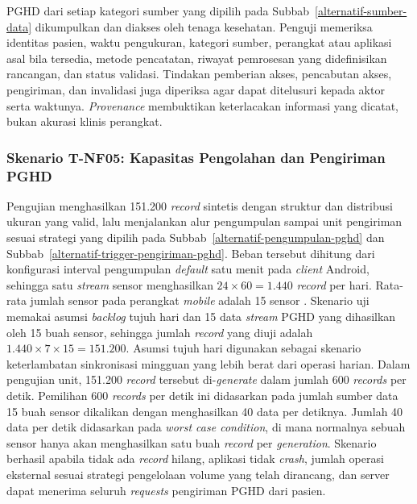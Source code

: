 PGHD dari setiap kategori sumber yang dipilih pada Subbab~\ref{alternatif-sumber-data} dikumpulkan dan diakses oleh tenaga kesehatan.
Penguji memeriksa identitas pasien, waktu pengukuran, kategori sumber, perangkat atau aplikasi asal bila tersedia, metode pencatatan, riwayat pemrosesan yang didefinisikan rancangan, dan status validasi.
Tindakan pemberian akses, pencabutan akses, pengiriman, dan invalidasi juga diperiksa agar dapat ditelusuri kepada aktor serta waktunya.
\textit{Provenance} membuktikan keterlacakan informasi yang dicatat, bukan akurasi klinis perangkat.


\subsubsection{Skenario T-NF05: Kapasitas Pengolahan dan Pengiriman PGHD}

Pengujian menghasilkan 151.200 \textit{record} sintetis dengan struktur dan distribusi ukuran yang valid, lalu menjalankan alur pengumpulan sampai unit pengiriman sesuai strategi yang dipilih pada Subbab~\ref{alternatif-pengumpulan-pghd} dan Subbab~\ref{alternatif-trigger-pengiriman-pghd}.
Beban tersebut dihitung dari konfigurasi interval pengumpulan \textit{default} satu menit pada \textit{client} Android, sehingga satu \textit{stream} sensor menghasilkan \(24 \times 60 = 1.440\) \textit{record} per hari.
Rata-rata jumlah sensor pada perangkat \textit{mobile} adalah 15 sensor \parencite{fortunebusinessinsightsSensorsSmartphones}.
Skenario uji memakai asumsi \textit{backlog} tujuh hari dan 15 data \textit{stream} PGHD yang dihasilkan oleh 15 buah sensor, sehingga jumlah \textit{record} yang diuji adalah \(1.440 \times 7 \times 15 = 151.200\).
Asumsi tujuh hari digunakan sebagai skenario keterlambatan sinkronisasi mingguan yang lebih berat dari operasi harian.
Dalam pengujian unit, 151.200 \textit{record} tersebut di-\textit{generate} dalam jumlah 600 \textit{records} per detik.
Pemilihan 600 \textit{records} per detik ini didasarkan pada jumlah sumber data 15 buah sensor dikalikan dengan menghasilkan 40 data per detiknya.
Jumlah 40 data per detik didasarkan pada \textit{worst case condition}, di mana normalnya sebuah sensor hanya akan menghasilkan satu buah \textit{record} per \textit{generation}.
Skenario berhasil apabila tidak ada \textit{record} hilang, aplikasi tidak \textit{crash}, jumlah operasi eksternal sesuai strategi pengelolaan volume yang telah dirancang, dan server dapat menerima seluruh \textit{requests} pengiriman PGHD dari pasien.

